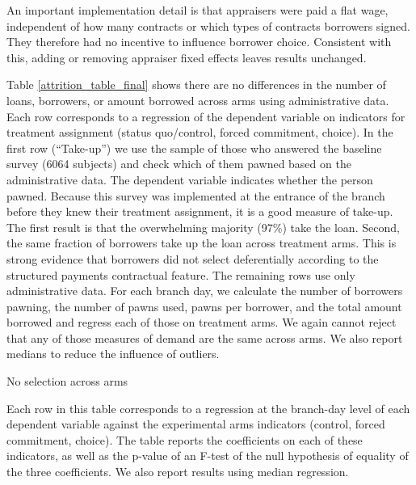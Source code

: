 \documentclass[12pt, a4paper]{article}
\begin{document}
An important implementation detail is that appraisers were paid a flat wage, independent of how many contracts or which types of contracts borrowers signed. They therefore had no incentive to influence borrower choice. Consistent with this, adding or removing appraiser fixed effects leaves results unchanged. 

Table \ref{attrition_table_final} shows there are no differences in the number of loans, borrowers, or amount borrowed across arms using administrative data. Each row corresponds to a regression of the dependent variable on indicators for treatment assignment (status quo/control, forced commitment, choice). In the first row (``Take-up'') we use the sample of those who answered the baseline survey (6064 subjects) and check which of them pawned based on the administrative data. The dependent variable indicates whether the person pawned. Because this survey was implemented at the entrance of the branch before they knew their treatment assignment, it is a good measure of take-up. The first result is that the overwhelming majority (97\%) take the loan. Second, the same fraction of borrowers take up the loan across treatment arms. This is strong evidence that borrowers did not select deferentially according to the structured payments contractual feature. The remaining rows use only administrative data. For each branch day, we calculate the number of borrowers pawning, the number of pawns used, pawns per borrower, and the total amount borrowed and regress each of those on treatment arms. We again cannot reject that any of those measures of demand are the same across arms.  We also report medians to reduce the influence of outliers. 


\begin{table}[H]
\caption{No selection across arms}
\label{attrition_table_final}
\begin{center}
\footnotesize{}
\end{center}
\scriptsize{Each row in this table 
 corresponds to a regression at the branch-day level of each dependent variable against the experimental arms indicators (control, forced commitment, choice). The table reports the coefficients on each of these indicators, as well as the p-value of an F-test of the null hypothesis of equality of the three coefficients. We also report results using median regression. %
 }
\end{table}
\end{document}
